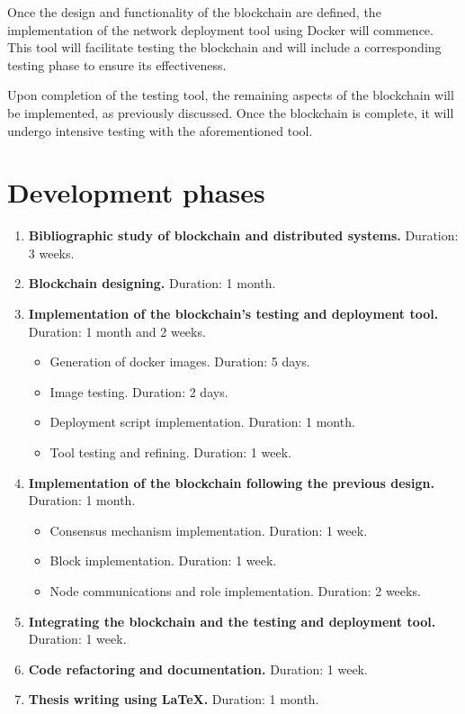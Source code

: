 \documentclass[twocolumn]{article}
\begin{document}
\noindent Once the design and functionality of the blockchain are defined, the implementation of the network deployment tool using Docker will commence. This tool will facilitate testing the blockchain and will include a corresponding testing phase to ensure its effectiveness.

\noindent Upon completion of the testing tool, the remaining aspects of the blockchain will be implemented, as previously discussed. Once the blockchain is complete, it will undergo intensive testing with the aforementioned tool.

\newpage


\section{Development phases}
\begin{enumerate}
    \item \textbf{Bibliographic study of blockchain and distributed systems.} Duration: 3 weeks.
    \item \textbf{Blockchain designing.} Duration: 1 month.
    \item \textbf{Implementation of the blockchain's testing and deployment tool.} Duration: 1 month and 2 weeks. 
    \begin{itemize}
        \item Generation of docker images. Duration: 5 days.
        \item Image testing. Duration: 2 days.
        \item Deployment script implementation. Duration: 1 month.
        \item Tool testing and refining. Duration: 1 week.
    \end{itemize}
    
    \item \textbf{Implementation of the blockchain following the previous design.} Duration: 1 month. \begin{itemize}
        \item Consensus mechanism implementation. Duration: 1 week.
        \item Block implementation. Duration: 1 week.
        \item Node communications and role implementation. Duration: 2 weeks.
    \end{itemize}
    
    \item \textbf{Integrating the blockchain and the testing and deployment tool.} Duration: 1 week.
    \item \textbf{Code refactoring and documentation.} Duration: 1 week.
    \item \textbf{Thesis writing using \LaTeX.} Duration: 1 month.
\end{enumerate}
\end{document}
